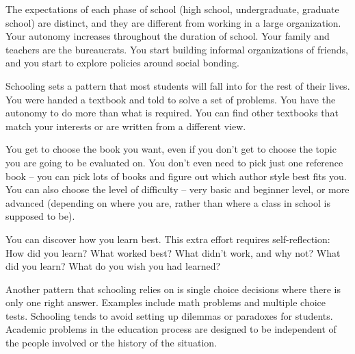 The expectations of each phase of school (high school, undergraduate, graduate school) are distinct, and they are different from working in a large organization. Your autonomy increases throughout the duration of school. %
Your family and teachers are the bureaucrats. You start building informal organizations of friends, and you start to explore policies around social bonding.

Schooling sets a pattern that most students will fall into for the rest of their lives. You were handed a textbook and told to solve a set of problems. You have the autonomy to do more than what is required. You can find other textbooks that match your interests or are written from a different view. 

You get to choose the book you want, even if you don't get to choose the topic you are going to be evaluated on. You don't even need to pick just one reference book -- you can pick lots of books and figure out which author style best fits you. You can also choose the level of difficulty -- very basic and beginner level, or more advanced (depending on where you are, rather than where a class in school is supposed to be).

You can discover how you learn best. This extra effort requires self-reflection: How did you learn? What worked best? What didn't work, and why not? What did you learn? What do you wish you had learned?

Another pattern that schooling relies on is single choice decisions where there is only one right answer. Examples include math problems and multiple choice tests. Schooling tends to avoid setting up dilemmas or paradoxes for students. Academic problems in the education process are designed to be independent of the people involved or the history of the situation. 








